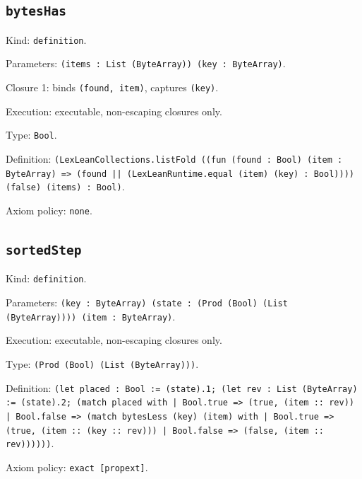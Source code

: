 \documentclass[11pt]{article}
\begin{document}
\subsection*{\texttt{bytesHas}}
\noindent Kind: \texttt{definition}.\par
\noindent Parameters: \texttt{(items : List (ByteArray)) (key : ByteArray)}.\par
\noindent Closure 1: binds \texttt{(found, item)}, captures \texttt{(key)}.\par
\noindent Execution: executable, non-escaping closures only.\par
\noindent Type: \texttt{Bool}.\par
\noindent Definition: \texttt{(LexLeanCollections.listFold ((fun (found : Bool) (item : ByteArray) => (found || (LexLeanRuntime.equal (item) (key) : Bool)))) (false) (items) : Bool)}.\par
\noindent Axiom policy: \texttt{none}.\par
\subsection*{\texttt{sortedStep}}
\noindent Kind: \texttt{definition}.\par
\noindent Parameters: \texttt{(key : ByteArray) (state : (Prod (Bool) (List (ByteArray)))) (item : ByteArray)}.\par
\noindent Execution: executable, non-escaping closures only.\par
\noindent Type: \texttt{(Prod (Bool) (List (ByteArray)))}.\par
\noindent Definition: \texttt{(let placed : Bool := (state).1; (let rev : List (ByteArray) := (state).2; (match placed with | Bool.true => (true, (item :: rev)) | Bool.false => (match bytesLess (key) (item) with | Bool.true => (true, (item :: (key :: rev))) | Bool.false => (false, (item :: rev))))))}.\par
\noindent Axiom policy: \texttt{exact [propext]}.\par
\end{document}
